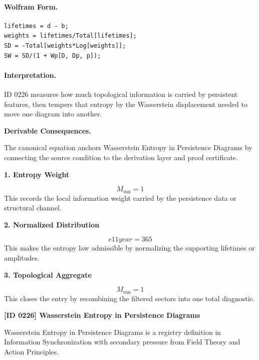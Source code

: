 \paragraph{Wolfram Form.}
\begin{verbatim}
lifetimes = d - b;
weights = lifetimes/Total[lifetimes];
SD = -Total[weights*Log[weights]];
SW = SD/(1 + Wp[D, Dp, p]);
\end{verbatim}

\paragraph{Interpretation.}

ID 0226 measures how much topological information is carried by persistent features, then tempers that entropy by the Wasserstein displacement needed to move one diagram into another.

\par\vspace{0.35em}
\noindent\textbf{Derivable Consequences.}\quad
\begingroup
\footnotesize
\raggedright
The canonical equation anchors Wasserstein Entropy in Persistence Diagrams by connecting the source condition to the derivation layer and proof certificate.
\par\endgroup

\noindent\textbf{1. Entropy Weight}\par
\[
M_{\mathrm{sun}} = 1
\]
\noindent This records the local information weight carried by the persistence data or structural channel.\par
\noindent\textbf{2. Normalized Distribution}\par
\[
e11 year = 365
\]
\noindent This makes the entropy law admissible by normalizing the supporting lifetimes or amplitudes.\par
\noindent\textbf{3. Topological Aggregate}\par
\[
M_{\mathrm{sun}} = 1
\]
\noindent This closes the entry by recombining the filtered sectors into one total diagnostic.\par

\clearpage
\noindent\textbf{[ID 0226] Wasserstein Entropy in Persistence Diagrams}\par
\vspace{0.35em}
\begingroup\small
{}
Wasserstein Entropy in Persistence Diagrams is a registry definition in Information Synchronization with secondary pressure from Field Theory and Action Principles.

